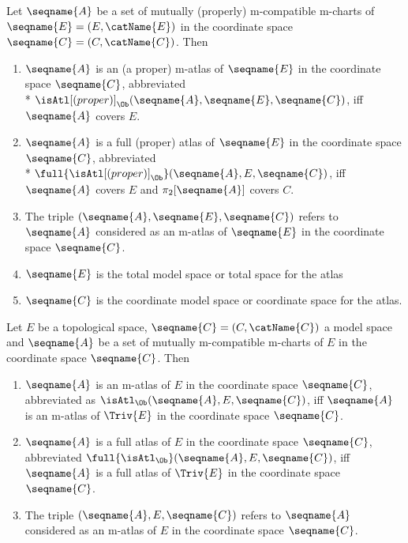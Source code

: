 \documentclass{article}
\begin{document}
\begin{definition}[M-atlases]
\label{def:M-atlas}
Let $\seqname{A}$ be a set of mutually (properly) m-compatible m-charts
of $\seqname{E}=(E, \catName{E})$ in the coordinate space
$\seqname{C}=(C,\catName{C})$. Then

\begin{enumerate}
\item
$\seqname{A}$ is an (a proper) m-atlas of $\seqname{E}$ in the
coordinate space $\seqname{C}$, abbreviated \\*
$\isAtl[(proper)]_\Ob(\seqname{A}, \seqname{E}, \seqname{C})$, iff
$\seqname{A}$ covers $E$.

\item
$\seqname{A}$ is a full (proper) atlas of $\seqname{E}$ in the
coordinate space $\seqname{C}$, abbreviated \\*
$\full{\isAtl[(proper)]_\Ob}(\seqname{A}, E, \seqname{C})$, iff
$\seqname{A}$ covers $E$ and $\pi_2[\seqname{A}]$ covers $C$.

\item
The triple $(\seqname{A}, \seqname{E}, \seqname{C})$ refers to
$\seqname{A}$ considered as an m-atlas of $\seqname{E}$ in the
coordinate space $\seqname{C}$.

\item
$\seqname{E}$ is the total model space or total space for the atlas

\item
$\seqname{C}$ is the coordinate model space or coordinate space for the
atlas.
\end{enumerate}

Let $E$ be a topological space, $\seqname{C}=(C,\catName{C})$ a model
space and $\seqname{A}$ be a set of mutually m-compatible m-charts of
$E$ in the coordinate space $\seqname{C}$. Then

\begin{enumerate}[resume]
\item
$\seqname{A}$ is an m-atlas of $E$ in the coordinate space
$\seqname{C}$, abbreviated as
$\isAtl_\Ob(\seqname{A}, E, \seqname{C})$, iff $\seqname{A}$ is an
m-atlas of $\Triv{E}$ in the coordinate space $\seqname{C}$.

\item
$\seqname{A}$ is a full atlas of $E$ in the coordinate space
$\seqname{C}$, abbreviated
$\full{\isAtl_\Ob}(\seqname{A}, E, \seqname{C})$, iff $\seqname{A}$ is a
full atlas of $\Triv{E}$ in the coordinate space $\seqname{C}$.

\item
The triple $(\seqname{A}, E, \seqname{C})$ refers to $\seqname{A}$
considered as an m-atlas of $E$ in the coordinate space $\seqname{C}$.


\end{enumerate}
\end{definition}
\end{document}
